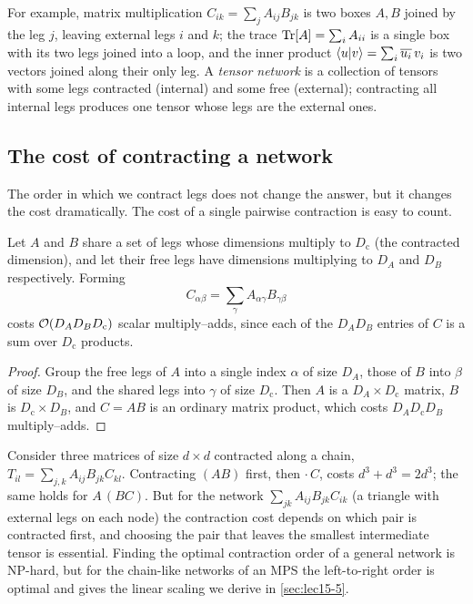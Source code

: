 For example, matrix multiplication $C_{ik}=\sum_j A_{ij}B_{jk}$ is two boxes
$A,B$ joined by the leg $j$, leaving external legs $i$ and $k$; the trace
$\operatorname{Tr}[A]=\sum_i A_{ii}$ is a single box with its two legs joined into a loop, and
the inner product $\braket{u|v}=\sum_i \overline{u_i}\,v_i$ is two vectors joined
along their only leg. A \emph{tensor network} is a collection of tensors with
some legs contracted (internal) and some free (external); contracting all
internal legs produces one tensor whose legs are the external ones.

\subsection{The cost of contracting a network}

The order in which we contract legs does not change the answer, but it changes
the cost dramatically. The cost of a single pairwise contraction is easy to
count.

\begin{proposition}\label{prop:lec15-cost}
Let $A$ and $B$ share a set of legs whose dimensions multiply to $D_{\mathrm c}$
(the contracted dimension), and let their free legs have dimensions multiplying
to $D_A$ and $D_B$ respectively. Forming
\[
  C_{\alpha\beta}=\sum_{\gamma} A_{\alpha\gamma}B_{\gamma\beta}
\]
costs $\mathcal{O}(D_A D_B D_{\mathrm c})$ scalar multiply--adds, since each of the
$D_A D_B$ entries of $C$ is a sum over $D_{\mathrm c}$ products.
\end{proposition}

\begin{proof}
Group the free legs of $A$ into a single index $\alpha$ of size $D_A$, those of
$B$ into $\beta$ of size $D_B$, and the shared legs into $\gamma$ of size
$D_{\mathrm c}$. Then $A$ is a $D_A\times D_{\mathrm c}$ matrix, $B$ is
$D_{\mathrm c}\times D_B$, and $C=AB$ is an ordinary matrix product, which costs
$D_A D_{\mathrm c}D_B$ multiply--adds.
\end{proof}

\begin{example}\label{exa:lec15-order}
Consider three matrices of size $d\times d$ contracted along a chain,
$T_{il}=\sum_{j,k}A_{ij}B_{jk}C_{kl}$. Contracting $(AB)$ first, then $\cdot\,C$,
costs $d^{3}+d^{3}=2d^{3}$; the same holds for $A\,(BC)$. But for the network
$\sum_{jk}A_{ij}B_{jk}C_{ik}$ (a triangle with external legs on each node) the
contraction cost depends on which pair is contracted first, and choosing the pair
that leaves the smallest intermediate tensor is essential. Finding the optimal
contraction order of a general network is NP-hard, but for the chain-like
networks of an MPS the left-to-right order is optimal and gives the linear
scaling we derive in \cref{sec:lec15-5}.
\end{example}

